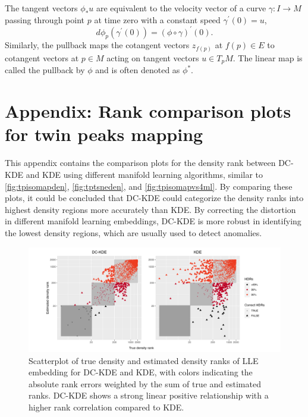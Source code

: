 \documentclass[11pt,a4paper,]{article}
\begin{document}
The tangent vectors \(\phi_*u\) are equivalent to the velocity vector of a curve \(\gamma: I\rightarrow M\) passing through point \(p\) at time zero with a constant speed \(\gamma^{\prime}(0)=u\),
\[
d\phi_p(\gamma^{\prime}(0)) = (\phi \circ \gamma)^\prime (0).
\]
Similarly, the pullback maps the cotangent vectors \(z_{f(p)}\) at \(f(p) \in E\) to cotangent vectors at \(p \in M\) acting on tangent vectors \(u \in T_pM\). The linear map is called the pullback by \(\phi\) and is often denoted as \(\phi^*\).

\hypertarget{twinpeaksappe}{%
\section{Appendix: Rank comparison plots for twin peaks mapping}\label{twinpeaksappe}}

This appendix contains the comparison plots for the density rank between DC-KDE and KDE using different manifold learning algorithms, similar to \autoref{fig:tpisomapden}, \autoref{fig:tptsneden}, and \autoref{fig:tpisomapvs4ml}. By comparing these plots, it could be concluded that DC-KDE could categorize the density ranks into highest density regions more accurately than KDE. By correcting the distortion in different manifold learning embeddings, DC-KDE is more robust in identifying the lowest density regions, which are usually used to detect anomalies.

\begin{figure}

{\centering \includegraphics[width=1\linewidth]{figures/Twin Peak2000_densityrank_comparison_lle_radius8_r0_5_logrank_rec_colprob_smallblocks3_crossfalse} 

}

\caption{Scatterplot of true density and estimated density ranks of LLE embedding for DC-KDE and KDE, with colors indicating the absolute rank errors weighted by the sum of true and estimated ranks. DC-KDE shows a strong linear positive relationship with a higher rank correlation compared to KDE.}\label{fig:tplleden}
\end{figure}
\end{document}
